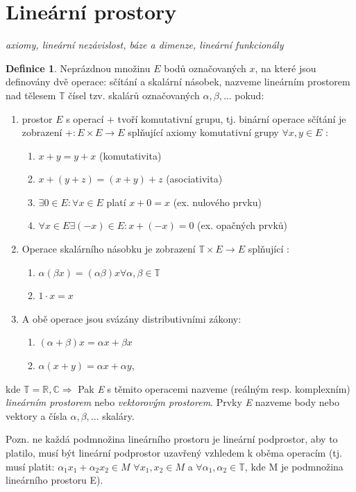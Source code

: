 \documentclass[a4]{report}
\theoremstyle{definition}
\newtheorem{definition}{Definice}[section]
\begin{document}
{\section{Lineární prostory}
\textit{axiomy, lineární nezávislost, báze a dimenze, lineární funkcionály}
\\
\begin{definition}
Neprázdnou množinu $E$ bodů označovaných $x$, na které jsou definovány dvě operace: sčítání a skalární násobek, nazveme lineárním prostorem nad tělesem $\mathbb{T}$ čísel tzv. skalárů označovaných $\alpha, \beta,\ldots$
pokud:
\begin{enumerate}
\item prostor $E$ s operací $+$ tvoří komutativní grupu, tj. binární operace sčítání je zobrazení $+:E \times E\rightarrow E $ splňující axiomy komutativní grupy  $\forall x,y \in E$ : \begin{enumerate}
\item  $x+y = y+x$ (komutativita)
\item $x+(y+z)=(x+y)+z$ (asociativita)
\item $\exists 0 \in E: \forall x \in E$ platí $x+0=x$ (ex. nulového prvku)
\item $\forall x \in E \exists (-x)\in E: x+(-x)=0$ (ex. opačných prvků)
\end{enumerate}
\item Operace skalárního násobku je zobrazení $\mathbb{T}\times E\rightarrow E$ splňující :\begin{enumerate}
\item $\alpha (\beta x) = (\alpha \beta) x \forall  \alpha, \beta \in \mathbb{T}$
\item $1 \cdot x = x$
\end{enumerate}
\item A obě operace jsou svázány distributivními zákony: \begin{enumerate}
\item $(\alpha+\beta) x = \alpha x + \beta x$
\item $\alpha (x+y) = \alpha x + \alpha y$,
\end{enumerate}
\end{enumerate}
kde $\mathbb{T}=\mathbb{R,C}\Rightarrow$ Pak \textit{E} s těmito operacemi nazveme (reálným resp. komplexním) \textit{lineárním prostorem} nebo \textit{vektorovým prostorem}. Prvky \textit{E} nazveme body nebo vektory a čísla $\alpha, \beta, ...$ skaláry. 
\end{definition}

Pozn. ne každá podmnožina lineárního prostoru je lineární podprostor, aby to platilo, musí být lineární podprostor uzavřený vzhledem k oběma operacím (tj. musí platit: $\alpha_1 x_1 + \alpha_2 x_2 \in M$ $\forall x_1,x_2 \in M$ a $\forall \alpha_1,\alpha_2 \in \mathbb{T}$, kde M je podmnožina lineárního prostoru E).

}
\end{document}

